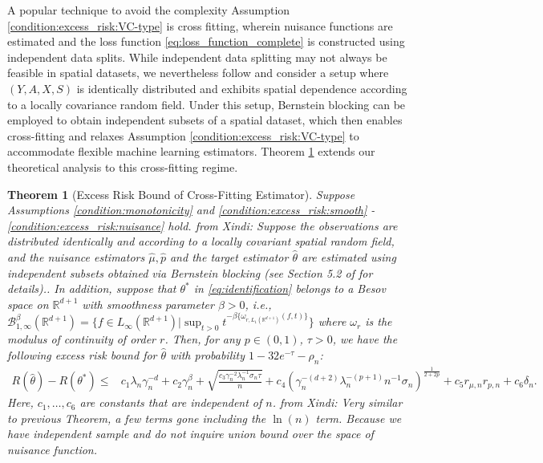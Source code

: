 \documentclass[12pt]{article}
\newtheorem{theorem}{Theorem}%
\newcommand{\R}{\mathbb{R}}
\newcommand{\XL}[1]{{\color{blue}from Xindi: #1}}
\begin{document}
A popular technique to avoid the complexity Assumption \ref{condition:excess_risk:VC-type} is cross fitting, wherein nuisance functions are estimated and the loss function \eqref{eq:loss_function_complete} is constructed using independent data splits.
While independent data splitting may not always be feasible in spatial datasets, we nevertheless follow \citet{gilbert2021causal} and consider a setup where $(Y, A, X, S)$ is identically distributed and exhibits spatial dependence according to a locally covariance random field. Under this setup, Bernstein blocking can be employed to obtain independent subsets of a spatial dataset, which then enables cross-fitting and relaxes Assumption \ref{condition:excess_risk:VC-type} to accommodate flexible machine learning estimators. Theorem \ref{thm:excess_risk_cross_fitting} extends our theoretical analysis to this cross-fitting regime.

 \begin{theorem}[Excess Risk Bound of Cross-Fitting Estimator] \label{thm:excess_risk_cross_fitting}
     Suppose Assumptions \ref{condition:monotonicity} and \ref{condition:excess_risk:smooth} - \ref{condition:excess_risk:nuisance} hold. \XL{Suppose the observations are distributed identically and according to a locally covariant spatial random field, and the nuisance estimators $\widehat\mu,\widehat p$ and the target estimator $\widehat\theta$ are estimated using independent subsets obtained via Bernstein blocking (see Section 5.2 of \citet{gilbert2021causal} for details).}. In addition, suppose that $\theta^*$ in \eqref{eq:identification} belongs to a Besov space on $\R^{d+1}$ with smoothness parameter $\beta>0$, i.e., $\mathcal{B}_{1,\infty}^\beta(\R^{d+1}) = \{f\in L_\infty(\R^{d+1})|\sup_{t>0}t^{-\beta\{\omega_{r,L_1(\R^{d+1})}(f,t)\}}\}$ where $\omega_r$ is the modulus of continuity of order $r$. Then, for any $p\in(0,1)$, $\tau>0$, we have the following excess risk bound for $\widehat\theta$ with probability $1-32e^{-\tau}-\rho_n$:
\begin{align}
       R(\widehat\theta)-R\left(\theta^*\right) 
       \leq & c_1 \lambda_n\gamma_n^{-d} + c_2\gamma_n^{\beta}+ \sqrt{\frac{ c_3\gamma_n^{-2}\lambda_n^{-1}\sigma_n\tau}{n}} + c_4\left(\gamma_n^{-(d+2)}\lambda_n^{-(p+1)}n^{-1}\sigma_n\right)^{\frac{1}{2+2p}} + c_5r_{\mu,n}r_{p,n} + c_6{\delta_n}. \label{eq:excess_risk_cross_fitting}
    \end{align}       
Here, $c_1,\ldots,c_6$ are constants that are independent of $n$. 
\XL{Very similar to previous Theorem, a few terms gone including the $\ln(n)$ term. Because we have independent sample and do not inquire union bound over the space of nuisance function.}
\end{theorem}
\end{document}

